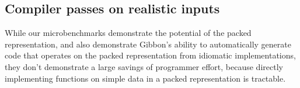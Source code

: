 \documentclass[a4paper,english]{lipics-v2016}
\newcommand{\treelang}{Gibbon\xspace} %
\begin{document}
% 
% 
% 



\subsection{Compiler passes on realistic inputs} \label{sec:astbench}

While our microbenchmarks demonstrate the potential of the packed
representation, and also demonstrate \treelang{}'s ability to automatically
generate code that operates on the packed representation from idiomatic
implementations, they don't demonstrate a large savings of programmer effort,
because directly implementing functions on simple data in a packed
representation is tractable.
\end{document}

